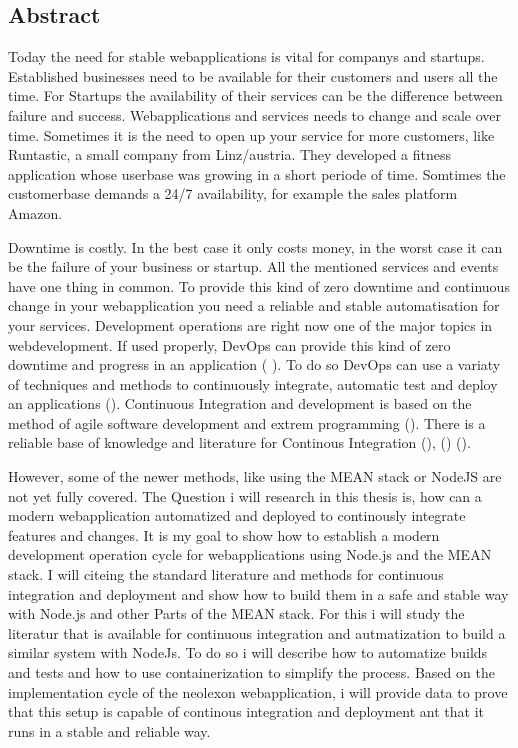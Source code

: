 \subsection*{Abstract}

Today the need for stable webapplications is vital for companys and startups. Established businesses need to be
available for their customers and users all the time. For Startups the availability of their services can be the difference
between failure and success. Webapplications and services needs to change and scale over time. Sometimes it is the need
to open up your service for more customers, like Runtastic, a small company from Linz/austria. They developed
a fitness application whose userbase was growing in a short periode of time. Somtimes the customerbase demands a 24/7
availability, for example the sales platform Amazon.

Downtime is costly. In the best case it only costs money, in the worst case
it can be the failure of your business or startup. All the mentioned services and events have one thing in common. To provide this kind of zero downtime and continuous change in
your webapplication you need a reliable and stable automatisation for your services. Development operations are right now one of
the major topics in webdevelopment. If used properly, DevOps can provide this kind of zero downtime and progress in an application
(\cite{humble2010continuous} \cite{duvall2007continuous}). To do so DevOps can use a variaty of techniques and methods to continuously
integrate, automatic test and deploy an applications (\cite{meyer2014continuous}).
Continuous Integration and development is based on the method of agile software development and extrem programming
(\cite{lindstrom2004extreme}). There is a reliable base of knowledge and literature for Continous Integration
(\cite{schaefer2013continuous}), (\cite{fowler2006continuous}) (\cite{fowler2012continuous}).

However, some of the newer methods, like using the MEAN stack or NodeJS are not yet fully covered.
The Question i will research in this thesis is, how can a modern webapplication automatized and deployed to continously integrate features and
changes. It is my goal to show how to establish a modern development operation cycle for webapplications using Node.js and the MEAN stack.
I will citeing the standard literature and methods for continuous integration and deployment and show how to build them in a safe and stable
way with Node.js and other Parts of the MEAN stack.
For this i will study the literatur that is available for continuous integration and autmatization to build a similar system with NodeJs.
To do so i will describe how to automatize builds and tests and how to use containerization to simplify the process. Based on the
implementation cycle of the neolexon webapplication, i will provide data to prove that this setup is capable of continous integration and deployment
ant that it runs in a stable and reliable way.


